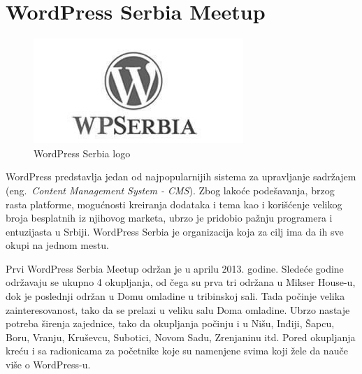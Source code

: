 \documentclass[a4paper]{article}
\begin{document}
{

\section{WordPress Serbia Meetup}
\begin{figure}[h!]
\begin{center}
\includegraphics[scale=0.5]{wp.jpg}
\end{center}
\caption{WordPress Serbia logo}
\label{fig:pande}
\end{figure}
WordPress predstavlja jedan od najpopularnijih sistema za upravljanje sadržajem (eng.~{\em Content Management System - CMS}). Zbog lakoće podešavanja, brzog rasta platforme, mogućnosti kreiranja dodataka i tema kao i korišćenje velikog broja besplatnih iz njihovog marketa, ubrzo je pridobio pažnju programera i entuzijasta u Srbiji. WordPress Serbia je organizacija koja za cilj ima da ih sve okupi na jednom mestu. 

Prvi WordPress Serbia Meetup održan je u aprilu 2013. godine. Sledeće godine održavaju se ukupno 4 okupljanja, od čega su prva tri održana u Mikser House-u, dok je poslednji održan u Domu omladine u tribinskoj sali. Tada počinje velika zainteresovanost, tako da se prelazi u veliku salu Doma omladine. Ubrzo nastaje potreba širenja zajednice, tako da okupljanja počinju i u Nišu, Inđiji, Šapcu, Boru, Vranju, Kruševcu, Subotici, Novom Sadu, Zrenjaninu itd. Pored okupljanja kreću i sa radionicama za početnike koje su namenjene svima koji žele da nauče više o WordPress-u.

}
\end{document}
